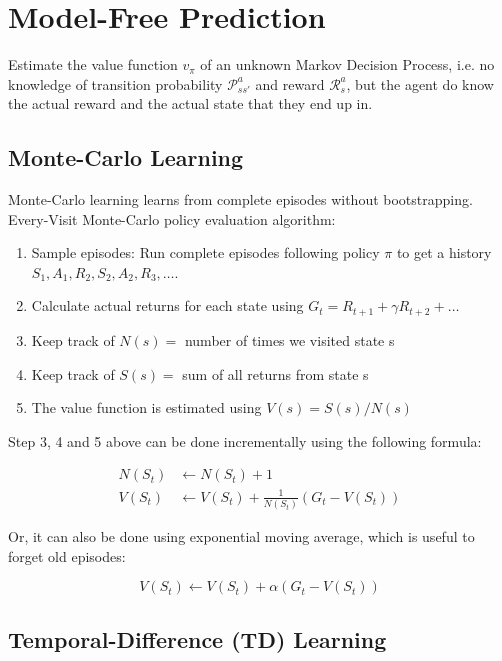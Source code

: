 \section{Model-Free Prediction}

Estimate the value function $v_\pi$ of an unknown Markov Decision Process, i.e.
no knowledge of transition probability $\mathcal{P}_{ss\prime}^a$ and reward
$\mathcal{R}_s^a$, but the agent do know the actual reward and the actual state
that they end up in.

\subsection{Monte-Carlo Learning}

Monte-Carlo learning learns from complete episodes without bootstrapping. \\

\noindent Every-Visit Monte-Carlo policy evaluation algorithm:

\begin{enumerate}
    \item Sample episodes: Run complete episodes following policy $\pi$ to get a history
          $S_1, A_1, R_2, S_2, A_2, R_3, \ldots$.
    \item Calculate actual returns for each state using $G_t = R_{t+1} + \gamma R_{t+2} +
              \ldots$
    \item Keep track of $N(s) = $ number of times we visited state s
    \item Keep track of $S(s) = $ sum of all returns from state s
    \item The value function is estimated using $V(s) = S(s) / N(s)$
\end{enumerate}

\noindent Step 3, 4 and 5 above can be done incrementally using the following formula:

\begin{align*}
    N(S_t) & \leftarrow N(S_t) + 1                               \\
    V(S_t) & \leftarrow V(S_t) + \frac{1}{N(S_t)} (G_t - V(S_t))
\end{align*}

\noindent Or, it can also be done using exponential moving average, which is useful to forget old episodes:

\[
    V(S_t) \leftarrow V(S_t) + \alpha (G_t - V(S_t))
\]

\subsection{Temporal-Difference (TD) Learning}

